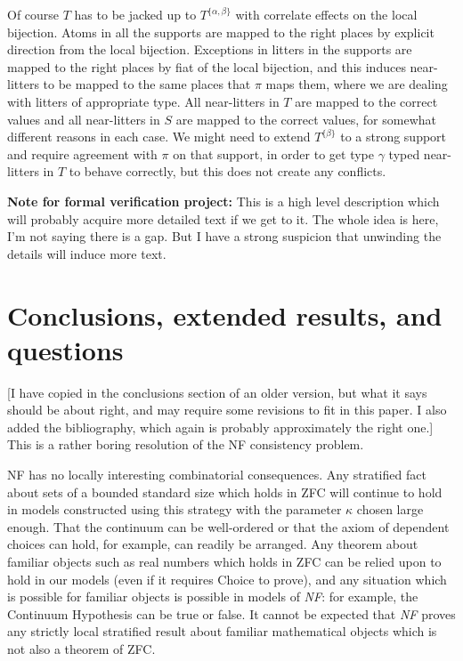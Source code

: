 \documentclass[112pt]{article}
\begin{document}
Of course $T$ has to be jacked up to $T^{\{\alpha,\beta\}}$ with correlate effects on the local bijection.  Atoms in all the supports are mapped to the right places by explicit direction from the local bijection.  Exceptions in litters in the supports are mapped to the right places by fiat of the local bijection, and this induces near-litters to be mapped to the same places that
$\pi$ maps them, where we are dealing with litters of appropriate type.  All near-litters in $T$ are mapped to the correct
values and all near-litters in $S$ are mapped to the correct values, for somewhat different reasons in each case.  We might need to extend $T^{\{\beta\}}$ to a strong support and require agreement with $\pi$ on that support, in order to get
type $\gamma$ typed near-litters in $T$ to behave correctly, but this does not create any conflicts.

{\bf Note for formal verification project:}  This is a high level description which will probably acquire more detailed text if we get to it.  The whole idea is here, I'm not saying there is a gap.  But I have a strong suspicion that unwinding the details will induce more text.

\newpage

\section{Conclusions, extended results, and questions}
[I have copied in the conclusions section of an older version, but what it says should be about right, 
and may require some revisions to fit in this paper.  I also added the bibliography, which again is probably approximately the right one.]
This is a rather boring resolution of the NF consistency problem.

NF has no locally interesting combinatorial consequences.   Any stratified fact about sets of a bounded standard size which holds in ZFC will continue to hold in models constructed using this strategy with the parameter $\kappa$ chosen large enough.
That the continuum can be well-ordered or that the axiom of dependent choices can hold, for example, can readily be arranged.  Any theorem about familiar objects such as real numbers which holds in ZFC can be relied upon to hold in our models
(even if it requires Choice to prove), and any situation which is possible for familiar objects is possible in models of {\em NF\/}:  for example, the Continuum Hypothesis can be true or false.  It cannot be expected that {\em NF\/} proves any strictly local stratified result about familiar mathematical objects which is not also a theorem of ZFC.
\end{document}
